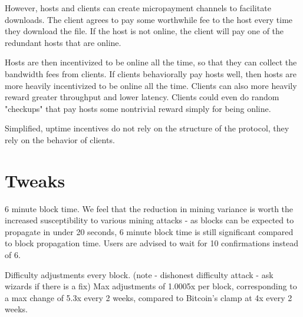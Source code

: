 \documentclass[twocolumn]{article}
\begin{document}
However, hosts and clients can create micropayment channels to facilitate downloads.
The client agrees to pay some worthwhile fee to the host every time they download the file.
If the host is not online, the client will pay one of the redundant hosts that are online.

Hosts are then incentivized to be online all the time, so that they can collect the bandwidth fees from clients.
If clients behaviorally pay hosts well, then hosts are more heavily incentivized to be online all the time.
Clients can also more heavily reward greater throughput and lower latency.
Clients could even do random "checkups" that pay hosts some nontrivial reward simply for being online.

Simplified, uptime incentives do not rely on the structure of the protocol, they rely on the behavior of clients.

%

\section{Tweaks}
6 minute block time. We feel that the reduction in mining variance is worth the increased susceptibility to various mining attacks - as blocks can be expected to propagate in under 20 seconds, 6 minute block time is still significant compared to block propagation time.
Users are advised to wait for 10 confirmations instead of 6.

Difficulty adjustments every block. (note - dishonest difficulty attack - ask wizards if there is a fix)
Max adjustments of 1.0005x per block, corresponding to a max change of 5.3x every 2 weeks, compared to Bitcoin's clamp at 4x every 2 weeks.
\end{document}
